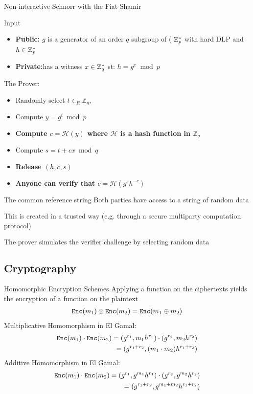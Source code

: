 \documentclass[handout]{beamer}
\begin{document}
\begin{frame}{Non-interactive Schnorr with the Fiat Shamir}
\begin{block}{Input}
\begin{itemize}
\item \textbf{Public:} $g$ is a generator of an order $q$ subgroup of ( $\mathbb{Z}^*_{p}$ with hard DLP and $h \in \mathbb{Z}^*_{p}$ 
\item \textbf{Private:}\prv has a witness $x \in \mathbb{Z}^*_{q}$ st: $h = g^x \bmod{p}$
\end{itemize}
\end{block}
\pause
The Prover:
\begin{itemize}
\item Randomly select $t \in_R \mathbb{Z}_{q}$,
\pause
\item Compute $y = g^t \bmod{p}$
\pause
\item \textbf{Compute $c = \mathcal{H}(y)$ where $\mathcal{H}$ is a hash function in $\mathbb{Z}_{q}$}
\pause

\item Compute $s=t+cx \bmod{q}$
\pause
\item \textbf{Release $(h,c,s)$}
\pause
\item \textbf{Anyone can verify that $c = \mathcal{H} (g^s h^{-c})$}
\end{itemize}
\end{frame} 

\begin{frame}{The common reference string}
Both parties have access to a string of random data

This is created in a trusted way (e.g. through a secure multiparty computation protocol)

The prover simulates the verifier challenge by selecting random data
\end{frame}

\subsection{Cryptography}

\begin{frame}{Homomorphic Encryption Schemes}
    Applying a function on the ciphertexts yields the encryption of a function on the plaintext
    \begin{align*}
    \mathtt{Enc}(m_1) \otimes \mathtt{Enc}(m_2) = \mathtt{Enc}(m_1 \oplus m_2)
    \end{align*}
    Multiplicative Homomorphism in El Gamal:
    \begin{align*}
    \mathtt{Enc}(m_1) \cdot \mathtt{Enc}(m_2) = (g^{r_1},m_1 h^{r_1}) \cdot (g^{r_2},m_2 h^{r_2}) \\ = (g^{r_1 + r_2}, (m_1 \cdot m_2) h^{r_1 + r_2})
    \end{align*} 
    Additive Homomorphism in El Gamal:
    \begin{align*}
    \mathtt{Enc}(m_1) \cdot \mathtt{Enc}(m_2) = (g^{r_1},g^{m_1} h^{r_1}) \cdot (g^{r_2},g^{m_2} h^{r_2}) \\ = (g^{r_1 + r_2}, g^{m_1 + m_2} h^{r_1 + r_2})
    \end{align*} 
\end{frame}
\end{document}
